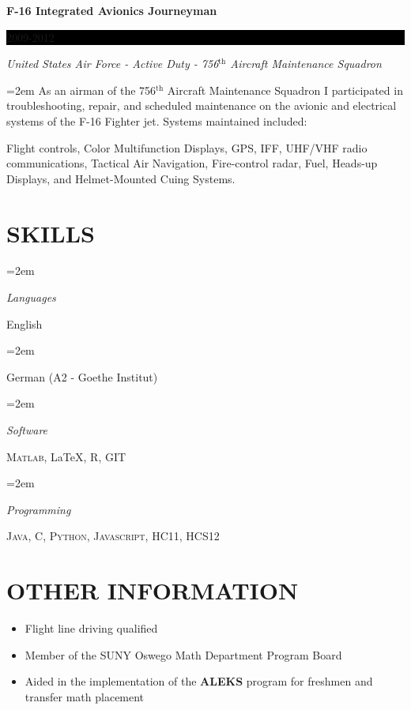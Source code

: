 \documentclass[paper=a4,fontsize=11pt]{scrartcl} %
\newlength{\spacebox}
\newcommand{\NewPart}[1]{\section*{\uppercase{#1}}}
\newcommand{\PersonalEntry}[2]{
		\noindent\hangindent=2em\hangafter=0 %
		\parbox{\spacebox}{        %
		\textit{#1}}		       %
		\hspace{1.5em} #2 \par}    %
\newcommand{\SkillsEntry}[2]{      %
		\noindent\hangindent=2em\hangafter=0 %
		\parbox{\spacebox}{        %
		\textit{#1}}			   %
		\hspace{1.5em} #2 \par}    %
\newcommand{\EducationEntry}[4]{
		\noindent \textbf{#1} \hfill      %
		\colorbox{Black}{%
			\parbox{6em}{%
			\hfill\color{White}#2}} \par  %
		\noindent \textit{#3} \par        %
		\noindent\hangindent=2em\hangafter=0 \small #4 %
		\normalsize \par}
\begin{document}
\EducationEntry{F-16 Integrated Avionics Journeyman}{\normalsize 2009-2012}{United States Air Force - Active Duty - 756$^{\text{th}}$ Aircraft Maintenance Squadron}{As an airman of the 756$^{\text{th}}$ Aircraft Maintenance Squadron I participated in troubleshooting, repair, and scheduled maintenance on the avionic and electrical systems of the F-16 Fighter jet. Systems maintained included:
\begin{center}
\begin{minipage}{10cm}
Flight controls, Color Multifunction Displays, GPS, IFF, UHF/VHF radio communications, Tactical Air Navigation, Fire-control radar, Fuel, Heads-up Displays, and Helmet-Mounted Cuing Systems.
\end{minipage}
\end{center}
}
\NewPart{\normalsize Skills}{}

\SkillsEntry{Languages}{English}
\SkillsEntry{}{German (A2 - Goethe Institut)}

\SkillsEntry{Software}{\textsc{Matlab}, \LaTeX, \textsc{R}, \textsc{GIT}}
\SkillsEntry{Programming}{\textsc{Java}, \textsc{C}, \textsc{Python}, \textsc{Javascript}, \textsc{HC11}, \textsc{HCS12}}


\NewPart{\normalsize Other Information}{}
\begin{itemize}
\item[] Flight line driving qualified
\item[] Member of the SUNY Oswego Math Department Program Board
\hspace*{2cm} \item[] Aided in the implementation of the \textbf{ALEKS} program for freshmen and transfer math placement
\end{itemize}
\end{document}
